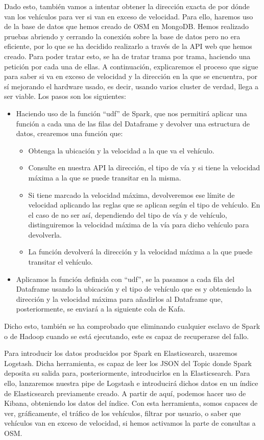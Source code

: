 Dado esto, también vamos a intentar obtener la dirección exacta de por dónde van los vehículos para ver si van en exceso de velocidad. Para ello, haremos uso de la base de datos que hemos creado de OSM en MongoDB. Hemos realizado pruebas abriendo y cerrando la conexión sobre la base de datos pero no era eficiente, por lo que se ha decidido realizarlo a través de la API web que hemos creado. Para poder tratar esto, se ha de tratar trama por trama, haciendo una petición por cada una de ellas. A continuación, explicaremos el proceso que sigue para saber si va en exceso de velocidad y la dirección en la que se encuentra, por sí mejorando el hardware usado, es decir, usando varios cluster de verdad, llega a ser viable. Los pasos son los siguientes:
\begin{itemize} 
	\item Haciendo uso de la función “udf” de Spark, que nos permitirá aplicar una función a cada una de las filas del Dataframe y devolver una estructura de datos, crearemos una función que:
	\begin{itemize} 
		\item Obtenga la ubicación y la velocidad a la que va el vehículo.
		\item Consulte en nuestra API la dirección, el tipo de vía y si tiene la velocidad máxima a la que se puede transitar en la misma.
		\item Si tiene marcado la velocidad máxima, devolveremos ese límite de velocidad aplicando las reglas que se aplican según el tipo de vehículo. En el caso de no ser así, dependiendo del tipo de vía y de vehículo, distinguiremos la velocidad máxima de la vía para dicho vehículo para devolverla.
		\item La función devolverá la dirección y la velocidad máxima a la que puede transitar el vehículo.
	\end{itemize} 
	\item Aplicamos la función definida con “udf”, se la pasamos a cada fila del Dataframe usando la ubicación y el tipo de vehículo que es y obteniendo la dirección y la velocidad máxima para añadirlos al Dataframe que, posteriormente, se enviará a la siguiente cola de Kafa.
\end{itemize} 
Dicho esto, también se ha comprobado que eliminando cualquier esclavo de Spark o de Hadoop cuando se está ejecutando, este es capaz de recuperarse del fallo.\par

Para introducir los datos producidos por Spark en Elasticsearch, usaremos Logstash. Dicha herramienta, es capaz de leer los JSON del Topic donde Spark deposita su salida para, posteriormente, introducirlos en la Elasticsearch. Para ello, lanzaremos nuestra pipe de Logstash e introducirá dichos datos en un índice de Elasticsearch previamente creado. A partir de aquí, podemos hacer uso de Kibana, obteniendo los datos del índice. Con esta herramienta, somos capaces de ver, gráficamente, el tráfico de los vehículos, filtrar por usuario, o saber que vehículos van en exceso de velocidad, si hemos activamos la parte de consultas a OSM.

